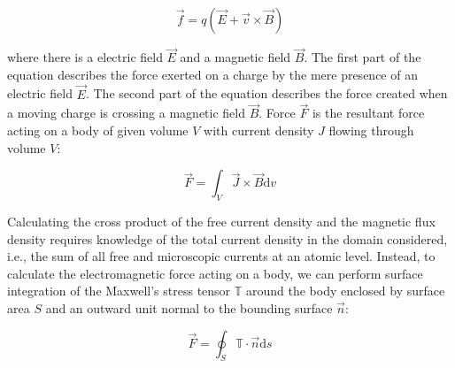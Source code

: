         
        \begin{equation}
            \overrightarrow{f} = q(\overrightarrow{E} + \overrightarrow{v} \times \overrightarrow{B})
            \label{eq:lorentz force equation}
        \end{equation}   
        
        
        where there is a electric field $\overrightarrow{E}$ and a magnetic field $\overrightarrow{B}$. The first part of the equation describes the force exerted on a charge by the mere presence of an electric field $\overrightarrow{E}$. The second part of the equation describes the force created when a moving charge is crossing a magnetic field $\overrightarrow{B}$. Force $\overrightarrow{F}$ is the resultant force acting on a body of given volume $V$ with current density $J$ flowing through volume $V$:
        
      
        \begin{equation}
            \overrightarrow{F} = \int_V \overrightarrow{J} \times \overrightarrow{B} \mathrm{d}v
            \label{eq:volume generalized lorentz}
        \end{equation} 
        
        
        Calculating the cross product of the free current density and the magnetic flux density requires knowledge of the total current density in the domain considered, i.e., the sum of all free and microscopic currents at an atomic level.
        Instead, to calculate the electromagnetic force acting on a body, we can perform surface integration of the Maxwell's stress tensor $\mathbb{T}$ around the body enclosed by surface area $S$ and an outward unit normal to the bounding surface $\overrightarrow{n}$:
        
        
        \begin{equation}
            \overrightarrow{F} = \oint_{S} \mathbb{T} \cdot \overrightarrow{n} \mathrm{d}s
            \label{eq:surface generalized lorentz}
        \end{equation}     




                
